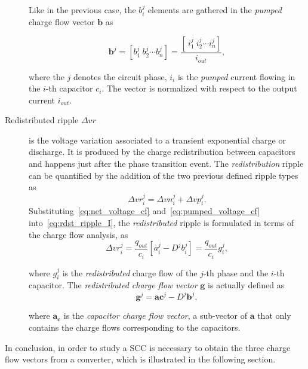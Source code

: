 \begin{description}
      Like in the previous case, the $b_i^j$ elements are gathered in the \emph{pumped} charge flow vector $\mathbf{b}$ as

      \begin{equation}
        \mathbf{b}^j =  \left[ b_1^j~b_2^j \cdots b_n^j \right] = \frac{\left[ ~i_1^j~i_2^j \cdots i_n^j \right]}{i_{out}},
      \label{eq:b_vector}
      \end{equation}

      where the $j$ denotes the circuit phase, $i_i$ is the \emph{pumped} current flowing in the $i$-th capacitor $c_i$. The vector is normalized with respect to the output current $i_{out}$.


  \item[Redistributed ripple $\Delta vr$ ]is the voltage variation associated to a transient exponential charge or discharge. It is produced by the charge redistribution between capacitors and happens just after the phase transition event. The \emph{redistribution} ripple can be quantified by the addition of the two previous defined ripple types as
      \begin{equation}
        \Delta {vr}^j_i  = \Delta {vn}^j_i + \Delta {vp}^j_i .
      \label{eq:rdst_ripple_I}
      \end{equation}
      Substituting~\eqref{eq:net_voltage_cf} and~\eqref{eq:pumped_voltage_cf} into~\eqref{eq:rdst_ripple_I}, the \emph{redistributed} ripple is formulated in terms of the charge flow analysis, as
      \begin{equation}
        \Delta {vr}^j_i  = \frac{q_{out}}{c_i} \left[ a^j_i - D^j b^j_i \right] = \frac{q_{out}}{c_i} g^j_i,
      \label{eq:rdst_ripple_II}
      \end{equation}

      where $g^j_i$ is the \emph{redistributed} charge flow of the $j$-th phase and the $i$-th capacitor. The \emph{redistributed charge flow vector} $\mathbf{g}$ is actually defined as
      \begin{equation}
        \mathbf{g}^j   = \mathbf{ac}^j - D^j \mathbf{b}^j,
      \label{eq:rdst_chrg_flow}
      \end{equation}

      where $\mathbf{a_c}$ is the \emph{capacitor charge flow vector}, a sub-vector of $\mathbf{a}$ that only contains the charge flows corresponding to the capacitors.
\end{description}

In conclusion, in order to study a SCC is necessary to obtain the three charge flow vectors from a converter, which is illustrated in the following section.

